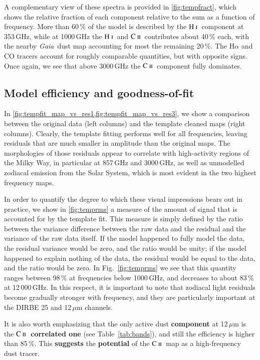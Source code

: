 \documentclass{aa}
\newcommand{\mathsc}[1]{{\normalfont\textsc{#1}}}
\def\Gaia{\textit{Gaia}}
\newcommand{\CII}{\ensuremath{\mathsc{C\ ii}}}
\newcommand{\HI}{\ensuremath{\mathsc{H\ i}}}
\begin{document}
A complementary view of these spectra is provided in
\cref{fig:tempfract}, which shows the relative fraction of each
component relative to the sum as a function of frequency. More than
60\,\% of the model is described by the \HI\ component at 353\,GHz,
while at 1000\,GHz the \HI\ and \CII\ contributes about 40\,\% each,
with the nearby \Gaia\ dust map accounting for most the remaining
20\,\%. The H$\alpha$ and CO tracers account for roughly comparable
quantities, but with opposite signs. Once again, we see that above
3000\,GHz the \CII\ component fully dominates.

\subsection{Model efficiency and goodness-of-fit}
\label{sec:residuals}
In
\cref{fig:tempfit_map_vs_res1,fig:tempfit_map_vs_res3},
we show a comparison between the original data (left columns) and the
template cleaned maps (right columns). Clearly, the template fitting
performs well for all frequencies, leaving residuals that are much
smaller in amplitude than the original maps. The morphologies of those
residuals appear to correlate with high-activity regions of the Milky
Way, in particular at 857\,GHz and 3000\,GHz, as well as unmodelled
zodiacal emission from the Solar System, which is most evident in the
two highest frequency maps.

In order to quantify the degree to which these visual impressions
bears out in practice, we show in \cref{fig:temprms} a measure of the
amount of signal that is accounted for by the template fit. This
measure is simply defined by the ratio between the variance difference
between the raw data and the residual and the variance of the raw data
itself. If the model happened to fully model the data, the residual
variance would be zero, and the ratio would be unity; if the model
happened to explain nothing of the data, the residual would be equal
to the data, and the ratio would be zero. In Fig.~\ref{fig:temprms} we
see that this quantity ranges between 98\,\% at frequencies below
1000\,GHz, and decreases to about 83\,\% at 12\,000\,GHz. In this
respect, it is important to note that zodiacal light residuals become
gradually stronger with frequency, and they are particularly important
at the DIRBE 25 and 12\,$\mu$m channels.

It is also worth emphasizing that the only active dust \textbf{component} at
12\,$\mu$m is the \textbf{\CII\ correlated one} (see Table~\ref{tab:bands}), and still the
efficiency is higher than 85\,\%. This \textbf{suggests} the
\textbf{potential} of the \CII\ map as a high-frequency dust tracer.
\end{document}
